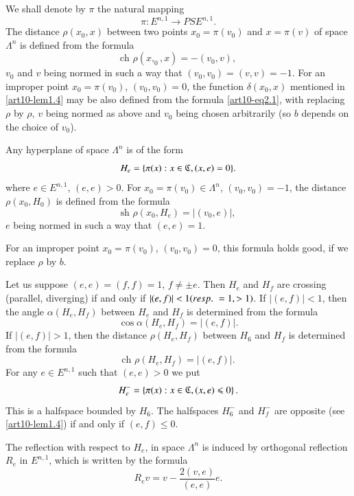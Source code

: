 We shall denote by $\pi$ the natural mapping 
$$
\pi : E^{n,1} \to PSE^{n,1}.
$$
The distance $\rho (x_0, x)$ between two points $x_0 = \pi (v_0)$ and $x = \pi (v)$ of space $\Lambda^n$ is defined from the  formula
\setcounter{equation}{0}
\begin{equation}
\text{ch } \rho (x,_0 , x) = - (v_0, v), \label{art10-eq2.1}
\end{equation}
$v_0$ and $v$ being normed in such a way that $(v_0, v_0) = (v,v) = -1$. For an improper point $x_0 = \pi (v_0)$, $(v_0, v_0) =0$, the function $\delta (x_0, x)$ mentioned in \ref{art10-lem1.4} may be also defined from the formula \eqref{art10-eq2.1}, with replacing $\rho$ by $\rho$, $v$ being normed as above and $v_0$ being chosen arbitrarily (so $b$ depends on the choice of $v_0$).

Any hyperplane of space $\Lambda^n$ is of the form 
$$
H_e = \{\pi (x) : x \in \mathfrak{C}, (x, e) = 0\}.
$$
where $e \in E^{n,1}$, $(e,e) >0$. For $x_0 = \pi (v_0) \in \Lambda^n$, $(v_0, v_0) = - 1$, the distance $\rho (x_0, H_0)$ is defined from the formula
\begin{equation}
\text{sh } \rho (x_0, H_e) = \left| (v_0, e)\right|, \label{art10-eq2.2}
\end{equation}
$e$ being normed in such a way that $(e,e) =1$.

For an improper point $x_0 = \pi (v_0)$, $(v_0, v_0) =0$, this formula holds good, if we replace $\rho$ by $b$.

Let us suppose $(e,e) = (f,f) = 1$, $f \neq \pm e$. Then $H_e$ and $H_f$ are crossing (\resp parallel, diverging) if and only if $|(e,f)| < 1 ({resp.}\kern.3em = 1, > 1)$. If $|(e,f)| <1$, then the angle $\alpha (H_e, H_f)$ between $H_e$ and $H_f$ is determined from the formula
$$
\cos \alpha (H_e, H_f) = |(e,f)|.
$$
If $|(e,f)| >1$, then the distance $\rho (H_e, H_f)$ between $H_6$ and $H_f$ is determined from the formula
$$
\text{ch } \rho (H_e, H_f) = |(e,f)|.
$$
For any $e \in E^{n,1}$ such that $(e,e) > 0$ we put 
\begin{equation}
H^-_e = \left\{\pi (x) : x \in \mathfrak{C}, (x,e) \leqslant 0 \right\}. \label{art10-eq2.3}
\end{equation}\pageoriginale 
This is a halfspace bounded by $H_6$. The halfspaces $H^-_6$ and $H^-_f$ are opposite (see \ref{art10-lem1.4}) if and only if $(e,f) \leqslant 0$.

The reflection with respect to $H_e$, in space $\Lambda^n$ is induced by orthogonal reflection $R_e$ in $E^{n,1}$, which is written by the formula
\begin{equation}
R_e v = v - \frac{2(v,e)}{(e,e)} e.  \label{art10-eq2.4}
\end{equation}

